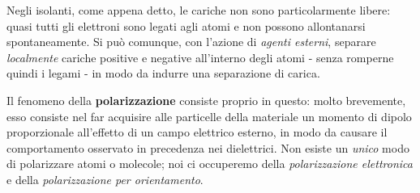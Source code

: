 Negli isolanti, come appena detto, le cariche non sono particolarmente libere: quasi tutti gli elettroni sono legati agli atomi e non possono allontanarsi spontaneamente. Si può comunque, con l'azione di \textit{agenti esterni}, separare \textit{localmente} cariche positive e negative all'interno degli atomi - senza romperne quindi i legami - in modo da indurre una separazione di carica.

Il fenomeno della \textbf{polarizzazione} consiste proprio in questo: molto brevemente, esso consiste nel far acquisire alle particelle della materiale un momento di dipolo proporzionale all'effetto di un campo elettrico esterno, in modo da causare il comportamento osservato in precedenza nei dielettrici. Non esiste un \textit{unico} modo di polarizzare atomi o molecole; noi ci occuperemo della \textit{polarizzazione elettronica} e della \textit{polarizzazione per orientamento}.
